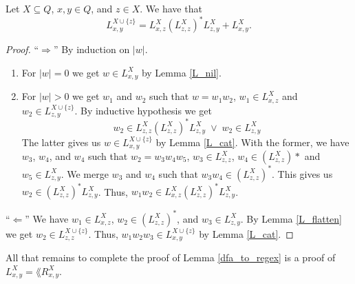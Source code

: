 \begin{lemma}
    \label{L_rec}
    Let $X \subseteq Q$, $x,y \in Q$, and $z \in X$.
    We have that 
    \begin{equation*}
        L^{X\cup\{z\}}_{x,y} = L^X_{x,z} (L^X_{z,z})^* L^X_{z,y} + L^X_{x,y}.
    \end{equation*}
\end{lemma}
\begin{proof}
    ``$\Rightarrow$''
    By induction on $|w|$.
    \begin{enumerate}
        \item For $|w| = 0$ we get $w \in L^X_{x,y}$ by Lemma \ref{L_nil}. 
        \item For $|w| > 0$ we get $w_1$ and $w_2$ such that $w = w_1 w_2$, $w_1 \in L^X_{x,z}$ and $w_2 \in L^{X\cup\{z\}}_{z,y}$.
            By inductive hypothesis we get 
            \begin{equation*}
             w_2 \in
               L^X_{z,z} (L^X_{z,z})^* L^X_{z,y} \; \vee \; w_2 \in L^X_{z,y}
            \end{equation*}
            The latter gives us $w \in L^{X\cup\{z\}}_{x,y}$ by Lemma \ref{L_cat}.
            With the former, we have $w_3$, $w_4$, and $w_4$ such that $w_2 = w_3 w_4 w_5$, $w_3 \in L^{X}_{z,z}$,
            $w_4 \in (L^X_{z,z})*$ and $w_5 \in L^X_{z,y}$.
            We merge $w_3$ and $w_4$ such that $w_3 w_4 \in (L^{X}_{z,z})^*$.
            This gives us $w_2  \in (L^{X}_{z,z})^* L^X_{z,y}$.
            Thus, $w_1 w_2 \in L^X_{x,z} (L^X_{z,z})^* L^X_{z,y}$.
        \end{enumerate}

    ``$\Leftarrow$''
    We have $w_1 \in L^X_{x,z}$, $w_2 \in (L^X_{z,z})^*$, and $w_3 \in L^X_{z,y}$.
    By Lemma \ref{L_flatten} we get $w_2 \in L^{X\cup\{z\}}_{z,z}$.
    Thus, $w_1 w_2 w_3 \in L^{X\cup\{z\}}_{x,y}$ by Lemma \ref{L_cat}.
\end{proof}

All that remains to complete the proof of Lemma \ref{dfa_to_regex} is a proof of $L^X_{x,y} = \lang{R^X_{x,y}}$.

